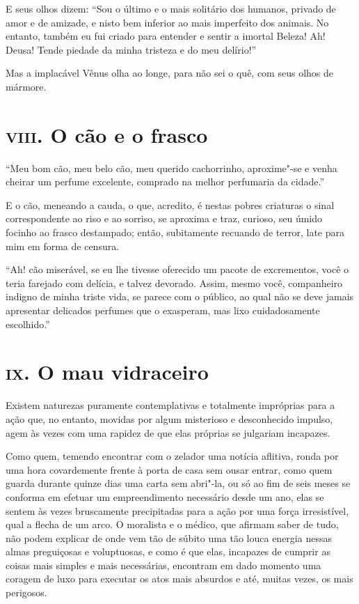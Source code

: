 E seus olhos dizem: ``Sou o último e o mais solitário dos
humanos, privado de amor e de amizade, e nisto bem inferior ao mais
imperfeito dos animais. No entanto, também eu fui criado para entender
e sentir a imortal Beleza! Ah! Deusa! Tende piedade da minha tristeza e
do meu delírio!''

Mas a implacável Vênus olha ao longe, para não sei o quê, com seus olhos
de mármore.

\chapter{\textsc{viii.} O cão e o frasco}

``Meu bom cão, meu belo cão, meu querido cachorrinho,
aproxime"-se e venha cheirar um perfume excelente, comprado na melhor
perfumaria da cidade.''

E o cão, meneando a cauda, o que, acredito, é nestas pobres criaturas o
sinal correspondente ao riso e ao sorriso, se aproxima e traz,
curioso, seu úmido focinho ao frasco destampado; então, subitamente
recuando de terror, late para mim em forma de censura.

``Ah! cão miserável, se eu lhe tivesse oferecido um pacote
de excrementos, você o teria farejado com delícia, e talvez devorado.
Assim, mesmo você, companheiro indigno de minha triste vida, se parece
com o público, ao qual não se deve jamais apresentar delicados perfumes
que o exasperam, mas lixo cuidadosamente escolhido.''

\chapter{\textsc{ix.} O mau vidraceiro}

Existem naturezas puramente contemplativas e totalmente impróprias para
a ação que, no entanto, movidas por algum misterioso e desconhecido impulso,
agem às vezes com uma rapidez de que elas próprias se julgariam
incapazes.

Como quem, temendo encontrar com o zelador uma notícia aflitiva,
ronda por uma hora covardemente frente à porta de casa sem ousar
entrar, como quem guarda durante quinze dias uma carta sem
abri"-la, ou só ao fim de seis meses se conforma em efetuar um
empreendimento necessário desde um ano, elas se sentem às vezes
bruscamente precipitadas para a ação por uma força irresistível, qual a
flecha de um arco. O moralista e o médico, que afirmam saber de tudo,
não podem explicar de onde vem tão de súbito uma tão louca energia
nessas almas preguiçosas e voluptuosas, e como é que elas, incapazes de
cumprir as coisas mais simples e mais necessárias, encontram em dado
momento uma coragem de luxo para executar os atos mais absurdos e até,
muitas vezes, os mais perigosos.

